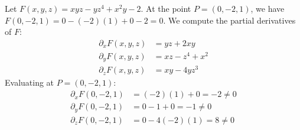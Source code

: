 \begin{exercisesolution}
Let $F(x,y,z) = xyz - yz^4 + x^2y - 2$. At the point $P = (0,-2,1)$, we have $F(0,-2,1) = 0 - (-2)(1) + 0 - 2 = 0$.
We compute the partial derivatives of $F$:
\begin{align*}
\partial_x F(x,y,z) &= yz + 2xy \\
\partial_y F(x,y,z) &= xz - z^4 + x^2 \\
\partial_z F(x,y,z) &= xy - 4yz^3
\end{align*}
Evaluating at $P = (0,-2,1)$:
\begin{align*}
\partial_x F(0,-2,1) &= (-2)(1) + 0 = -2 \neq 0 \\
\partial_y F(0,-2,1) &= 0 - 1 + 0 = -1 \neq 0 \\
\partial_z F(0,-2,1) &= 0 - 4(-2)(1) = 8 \neq 0
\end{align*}


\end{exercisesolution}
